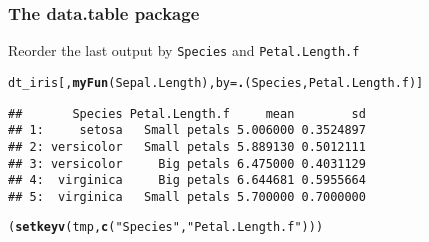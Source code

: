 \documentclass[paper=screen,mathserif]{beamer}\usepackage[]{graphicx}\usepackage[]{color}
\makeatletter
\newcommand{\hlstr}[1]{\textcolor[rgb]{0.192,0.494,0.8}{#1}}%
\newcommand{\hlstd}[1]{\textcolor[rgb]{0.345,0.345,0.345}{#1}}%
\newcommand{\hlkwc}[1]{\textcolor[rgb]{0.333,0.667,0.333}{#1}}%
\newcommand{\hlkwd}[1]{\textcolor[rgb]{0.737,0.353,0.396}{\textbf{#1}}}%
\newenvironment{kframe}{%
 \def\at@end@of@kframe{}%
 \ifinner\ifhmode%
  \def\at@end@of@kframe{\end{minipage}}%
  \begin{minipage}{\columnwidth}%
 \fi\fi%
 \def\FrameCommand##1{\hskip\@totalleftmargin \hskip-\fboxsep
 \colorbox{shadecolor}{##1}\hskip-\fboxsep
     \hskip-\linewidth \hskip-\@totalleftmargin \hskip\columnwidth}%
 \MakeFramed {\advance\hsize-\width
   \@totalleftmargin\z@ \linewidth\hsize
   \@setminipage}}%
 {\par\unskip\endMakeFramed%
 \at@end@of@kframe}
\newenvironment{knitrout}{}{} %
\newcommand{\ft}[1]{\frametitle{#1}}
\makeatother
\begin{document}
\begin{frame}[fragile]
  \ft{The {\bf data.table} package}

  Reorder the last output by {\tt Species} and {\tt Petal.Length.f}

\begin{knitrout}\scriptsize
{}\color{fgcolor}\begin{kframe}
\begin{alltt}
\hlstd{dt_iris[,} \hlkwd{myFun}\hlstd{(Sepal.Length),} \hlkwc{by} \hlstd{=} \hlkwd{.}\hlstd{(Species, Petal.Length.f)]}
\end{alltt}
\begin{verbatim}
##       Species Petal.Length.f     mean        sd
## 1:     setosa   Small petals 5.006000 0.3524897
## 2: versicolor   Small petals 5.889130 0.5012111
## 3: versicolor     Big petals 6.475000 0.4031129
## 4:  virginica     Big petals 6.644681 0.5955664
## 5:  virginica   Small petals 5.700000 0.7000000
\end{verbatim}
\begin{alltt}
\hlstd{(}\hlkwd{setkeyv}\hlstd{(tmp,} \hlkwd{c}\hlstd{(}\hlstr{"Species"}\hlstd{,} \hlstr{"Petal.Length.f"}\hlstd{)))}
\end{alltt}


{\ttfamily\noindent\bfseries\color{errorcolor}{\#\# Error in is.data.table(x): object 'tmp' not found}}\end{kframe}
\end{knitrout}
\end{frame}
\end{document}
